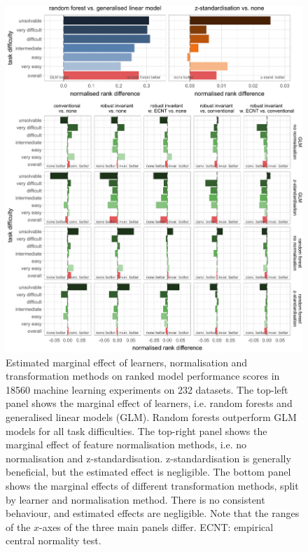 \documentclass[preprint,12pt,authoryear]{elsarticle}
\begin{document}
\begin{figure}

{\centering \includegraphics[width=1\linewidth]{figure_10} 

}

\caption{Estimated marginal effect of learners, normalisation and transformation methods on ranked model performance scores in 18560 machine learning experiments on 232 datasets. The top-left panel shows the marginal effect of learners, i.e. random forests and generalised linear models (GLM). Random forests outperform GLM models for all task difficulties. The top-right panel shows the marginal effect of feature normalisation methods, i.e. no normalisation and z-standardisation. z-standardisation is generally beneficial, but the estimated effect is negligible. The bottom panel shows the marginal effects of different transformation methods, split by learner and normalisation method. There is no consistent behaviour, and estimated effects are negligible. Note that the ranges of the $x$-axes of the three main panels differ. ECNT: empirical central normality test.}\label{fig:marginal-effect-plot}
\end{figure}
\end{document}
